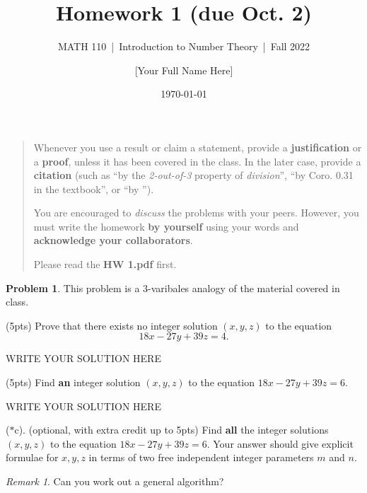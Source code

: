\documentclass[11pt]{article}
\title{Homework 1 (due Oct. 2)}
\author{[Your Full Name Here]}
\subtitle{MATH 110~|~Introduction to Number Theory~|~Fall 2022}
\date{\today}
\theoremstyle{plain}
\theoremstyle{definition}
\newtheorem{problem}{Problem}
\theoremstyle{remark}
\newtheorem*{remark}{Remark}
\numberwithin{equation}{problem}
\begin{document}
\maketitle

\begin{quotation}
	Whenever you use a result or claim a statement, provide a \textbf{justification} or a \textbf{proof}, unless it has been covered in the class. In the later case, provide a \textbf{citation} (such as ``by the \emph{2-out-of-3} property of \emph{division}'', ``by Coro. 0.31 in the textbook'', or ``by \cite[Coro. 0.31]{texbook}'').

	You are encouraged to \emph{discuss} the problems with your peers. However, you must write the homework \textbf{by yourself} using your words and \textbf{acknowledge your collaborators}.
	
	\Large Please read the \textbf{HW 1.pdf} first. 
\end{quotation}


\begin{problem}\label{p1}
	This problem is a $3$-varibales analogy of the material covered in class.
	\begin{listinprob}
		\item\label{1.a} (5pts) Prove that there exists no integer solution $(x, y, z)$ to the equation 
		\[
			18x - 27y + 39z = 4.
		\]

\begin{solution} %
WRITE YOUR SOLUTION HERE
\end{solution}\clearpage %

		\item\label{1.b} (5pts) Find \textbf{an} integer solution $(x, y, z)$ to the equation $18x - 27y + 39z = 6$. 

\begin{solution} %
WRITE YOUR SOLUTION HERE
\end{solution}\clearpage %
		
		\item[($\ast$c).]\label{1.c} (optional, with extra credit up to 5pts) Find \textbf{all} the integer solutions $(x, y, z)$ to the equation $18x - 27y + 39z = 6$. 
		Your answer should give explicit formulae for $x, y, z$ in terms of two free independent integer parameters $m$ and $n$.
		
	\end{listinprob}
	\begin{remark}
		Can you work out a general algorithm?
	\end{remark}
\end{problem}
\end{document}
